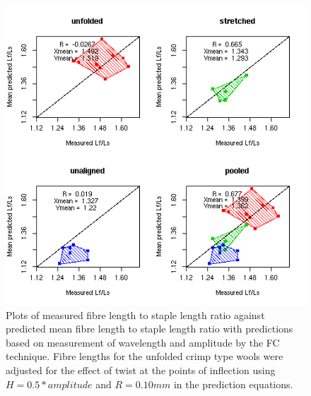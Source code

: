 %

\begin{figure}[!h]
  \centering
  \includegraphics[width=1.1\textwidth]{figfcpredlfr.png}
  \caption{Plots of measured fibre length to staple length ratio against predicted mean fibre length to staple length ratio with predictions based on measurement of wavelength and amplitude by the FC technique. Fibre lengths for the unfolded crimp type wools were adjusted for the effect of twist at the points of inflection using $H = 0.5 * amplitude$ and $R = 0.10 mm$ in the prediction equations.}
  \label{fig:fcpredlfr}
\end{figure}

%

